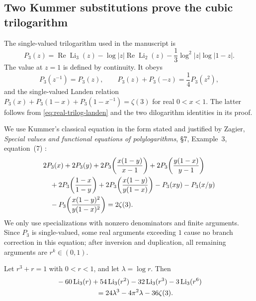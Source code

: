 \subsection{Two Kummer substitutions prove the cubic trilogarithm}

The single-valued trilogarithm used in the manuscript is
\[
P_3(z)=\operatorname{Re}\operatorname{Li}_3(z)
 -\log|z|\operatorname{Re}\operatorname{Li}_2(z)
 -\frac13\log^2|z|\log|1-z|.
\]
The value at $z=1$ is defined by continuity. It obeys
\[
P_3(z^{-1})=P_3(z),\qquad
P_3(z)+P_3(-z)=\frac14P_3(z^2),
\]
and the single-valued Landen relation
$P_3(x)+P_3(1-x)+P_3(1-x^{-1})=\zeta(3)$ for real $0<x<1$.
The latter follows from \eqref{eq:real-trilog-landen} and the two
dilogarithm identities in its proof.

We use Kummer's classical equation in the form stated and justified
by Zagier, \emph{Special values and functional equations of
polylogarithms}, \S7, Example~3, equation~(7) \cite{Zagier}:
\begin{align}
&2P_3(x)+2P_3(y)
 +2P_3\!\left(\frac{x(1-y)}{x-1}\right)
 +2P_3\!\left(\frac{y(1-x)}{y-1}\right)\notag\\
&\quad+2P_3\!\left(\frac{1-x}{1-y}\right)
 +2P_3\!\left(\frac{x(1-y)}{y(1-x)}\right)
 -P_3(xy)-P_3(x/y)\notag\\
&\quad-P_3\!\left(\frac{x(1-y)^2}{y(1-x)^2}\right)=2\zeta(3).
\label{eq:kummer-P3}
\end{align}
We only use specializations with nonzero denominators and finite
arguments. Since $P_3$ is single-valued, some real arguments exceeding
$1$ cause no branch correction in this equation; after inversion and
duplication, all remaining arguments are $r^k\in(0,1)$.

\begin{theorem}
\label{thm:cubic-proved}
Let $r^3+r=1$ with $0<r<1$, and let $\lambda=\log r$. Then
\begin{align}
&-60\operatorname{Li}_3(r)+54\operatorname{Li}_3(r^2)
 -32\operatorname{Li}_3(r^3)-3\operatorname{Li}_3(r^6)\notag\\
&\hspace{20mm}=24\lambda^3-4\pi^2\lambda-36\zeta(3).
\label{eq:cubic-proved}
\end{align}
\end{theorem}


